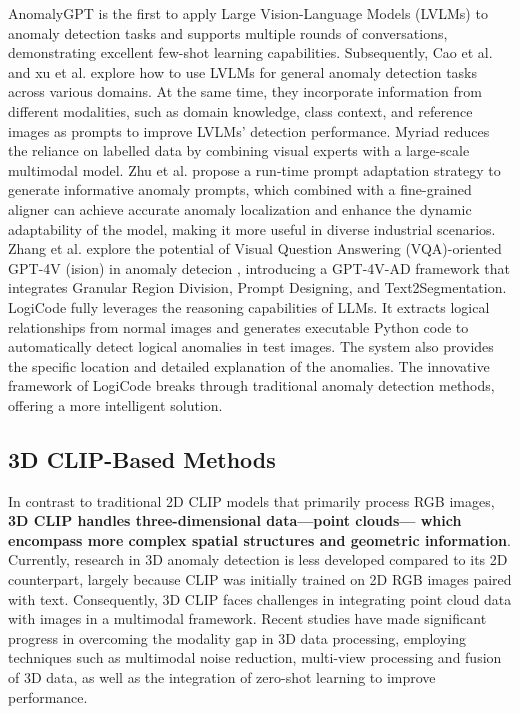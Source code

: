 \documentclass[journal,comsoc]{IEEEtran}
\begin{document}
AnomalyGPT \cite{gu2024anomalygpt} is the first to apply Large Vision-Language Models (LVLMs) \cite{ouyang2022training,touvron2023open} to anomaly detection tasks and supports multiple rounds of conversations, demonstrating excellent few-shot learning capabilities. Subsequently, Cao et al. \cite{cao2023towards} and xu et al. \cite{xu2024customizing} explore how to use LVLMs for general anomaly detection tasks across various domains. At the same time, they incorporate information from different modalities, such as domain knowledge, class context, and reference images as prompts to improve LVLMs' detection performance. Myriad \cite{li2023myriad} reduces the reliance on labelled data by combining visual experts with a large-scale multimodal model. Zhu et al. \cite{zhu2024alfa} propose a run-time prompt adaptation strategy to generate informative anomaly prompts, which combined with a fine-grained aligner can achieve accurate anomaly localization and enhance the dynamic adaptability of the model, making it more useful in diverse industrial scenarios. Zhang et al. \cite{zhang2024gpt} explore the potential of Visual Question Answering (VQA)-oriented GPT-4V (ision) in anomaly detecion \cite{cao2023towards}, introducing a GPT-4V-AD framework that integrates Granular Region Division, Prompt Designing, and Text2Segmentation. LogiCode \cite{zhang2024logicode} fully leverages the reasoning capabilities of LLMs. It extracts logical relationships from normal images and generates executable Python code to automatically detect logical anomalies in test images. The system also provides the specific location and detailed explanation of the anomalies. The innovative framework of LogiCode breaks through traditional anomaly detection methods, offering a more intelligent solution.


\subsection{3D CLIP-Based Methods}
In contrast to traditional 2D CLIP models that primarily process RGB images, \textbf{3D CLIP handles three-dimensional data—point clouds— which encompass more complex spatial structures and geometric information}. Currently, research in 3D anomaly detection is less developed compared to its 2D counterpart, largely because CLIP was initially trained on 2D RGB images paired with text. Consequently, 3D CLIP faces challenges in integrating point cloud data with images in a multimodal framework. Recent studies have made significant progress in overcoming the modality gap in 3D data processing, employing techniques such as multimodal noise reduction, multi-view processing and fusion of 3D data, as well as the integration of zero-shot learning to improve performance.
\end{document}

